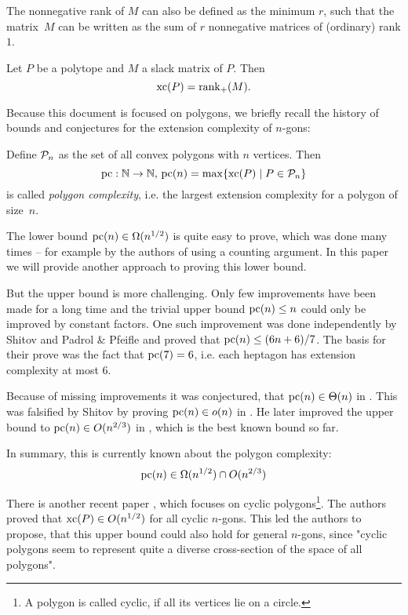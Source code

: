 The nonnegative rank of $M$ can also be defined as the minimum $r$, such that the matrix~$M$ can be written as the sum of $r$ nonnegative matrices of (ordinary) rank $1$.

\begin{theorem}
  Let $P$ be a polytope and $M$ a slack matrix of $P$. Then $$\xc(P) = \rank_+(M) .$$
\end{theorem}

Because this document is focused on polygons, we briefly recall the history of bounds and conjectures for the extension complexity of $n$-gons:

Define $\P_n$ as the set of all convex polygons with $n$ vertices. Then $$\pc:\N \to \N,\,\pc(n) = \max \{\xc(P) \mid P \in \P_n\}$$ is called \emph{polygon complexity}, i.e. the largest extension complexity for a polygon of size~$n$.

The lower bound $\pc(n) \in \Omega(n^{1/2})$ is quite easy to prove, which was done many times -- for example by the authors of \cite{fiorini2012extended} using a counting argument. In this paper we will provide another approach to proving this lower bound. 

But the upper bound is more challenging. Only few improvements have been made for a long time and the trivial upper bound $\pc(n) \leq n$ could only be improved by constant factors. One such improvement was done independently by Shitov \cite{shitov2014upper} and Padrol \& Pfeifle \cite{padrol2014polygons} and proved that $\pc(n) \leq (6n+6)/7$. The basis for their prove was the fact that $\pc(7)=6$, i.e. each heptagon has extension complexity at most 6.

Because of missing improvements it was conjectured, that $\pc(n) \in \Theta(n)$ in \cite{fiorini2012extended}. This was falsified by Shitov by proving $\pc(n) \in o(n)$ in \cite{shitov2014sublinear}. He later improved the upper bound to $\pc(n) \in O(n^{2/3})$ in \cite{shitov2020sublinear}, which is the best known bound so far.

In summary, this is currently known about the polygon complexity:
$$\pc(n) \in \Omega(n^{1/2}) \cap O(n^{2/3})$$

There is another recent paper \cite{kwan2020extension}, which focuses on cyclic polygons\footnote{A polygon is called cyclic, if all its vertices lie on a circle.}. The authors proved that $\xc(P) \in O(n^{1/2})$ for all cyclic $n$-gons. 
This led the authors to propose, that this upper bound could also hold for general $n$-gons, since "cyclic polygons seem to represent quite a diverse cross-section of the space of all polygons".



